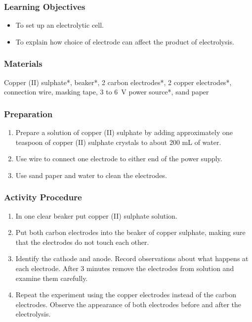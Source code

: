 \subsubsection*{Learning Objectives}
\begin{itemize}
\item{To set up an electrolytic cell.}
\item{To explain how choice of electrode can affect the product of electrolysis.}
\end{itemize}

\subsubsection*{Materials}
Copper (II) sulphate*, beaker*, 2 carbon electrodes*, 2 copper electrodes*, connection wire, masking tape, 3 to 6~V power source*, sand paper

\subsubsection*{Preparation}
\begin{enumerate}
\item{Prepare a solution of copper (II) sulphate by adding approximately one teaspoon of copper (II) sulphate crystals to about 200 mL of water.}
\item{Use wire to connect one electrode to either end of the power supply.}
\item{Use sand paper and water to clean the electrodes.}
\end{enumerate}

\subsubsection*{Activity Procedure}
\begin{enumerate}
\item{In one clear beaker put copper (II) sulphate solution.}
\item{Put both carbon electrodes into the beaker of copper sulphate, making sure that the electrodes do not touch each other.}
\item{Identify the cathode and anode. Record observations about what happens at each electrode. After 3 minutes remove the electrodes from solution and examine them carefully.}
\item{Repeat the experiment using the copper electrodes instead of the carbon electrodes. Observe the appearance of both electrodes before and after the electrolysis.}
\end{enumerate}

